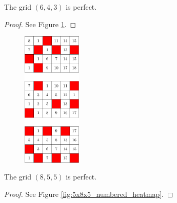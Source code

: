 \begin{con}
\label{con:6x4x3}
The grid $(6,4,3)$ is perfect.
\end{con}

\begin{proof}
See Figure \ref{fig:4x6x3_numbered_heatmap}.
\end{proof}

\begin{figure}[H]
\centering
\includegraphics[width=0.25\textwidth]{figures/A/4x6x3_numbered_heatmap.pdf}
\caption{}
\label{fig:4x6x3_numbered_heatmap}
\end{figure}

\newpage




\begin{con}
\label{con:8x5x5}
The grid $(8,5,5)$ is perfect.
\end{con}

\begin{proof}
See Figure \ref{fig:5x8x5_numbered_heatmap}.
\end{proof}

